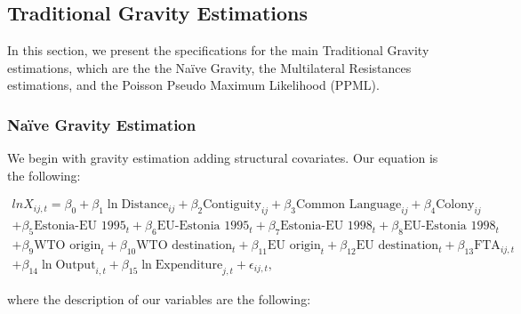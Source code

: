 \documentclass[a4paper,10pt]{article}
\begin{document}
\subsection{Traditional Gravity Estimations} \label{traditional}

In this section, we present the specifications for the main Traditional Gravity estimations, which are the the Naïve Gravity, the Multilateral Resistances estimations, and the Poisson Pseudo Maximum Likelihood (PPML).

\subsubsection{Naïve Gravity Estimation} \label{traditional_naive}

We begin with \cite{tinbergen_shaping_1962} gravity estimation adding structural covariates. Our equation is the following:

\vspace{-1cm}

	\begin{multline*}
		ln X_{ij,t}  = \beta_{0} + \beta_{1} \ln \text{Distance}_{ij} + \beta_{2} \text{Contiguity}_{ij} + \beta_{3} \text{Common Language}_{ij} + \beta_{4} \text{Colony}_{ij} \\
		+ \beta_{5} \text{Estonia-EU 1995}_{t} + \beta_{6} \text{EU-Estonia 1995}_{t} + \beta_{7} \text{Estonia-EU 1998}_{t} + \beta_{8} \text{EU-Estonia 1998}_{t} \\
		+ \beta_{9} \text{WTO origin}_{t} + \beta_{10} \text{WTO destination}_{t} + \beta_{11} \text{EU origin}_{t} + \beta_{12} \text{EU destination}_{t} + \beta_{13} \text{FTA}_{ij,t} \\
		+ \beta_{14} \ln \text{Output}_{i,t} + \beta_{15} \ln \text{Expenditure}_{j,t} + \epsilon_{ij,t},
	\end{multline*}

\noindent where the description of our variables are the following:
\end{document}
